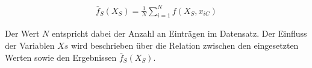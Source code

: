 \begin{equation}
  \begin{aligned}
    \bar{f}_S(X_S) = \frac{1}{N}\sum_{i=1}^{N}f(X_S, x_{iC})
  \end{aligned}
  \label{fig:partial_dependence}
\end{equation}

\noindent Der Wert $N$ entspricht dabei der Anzahl an Einträgen im Datensatz. Der Einfluss der Variablen $Xs$ wird beschrieben über die Relation zwischen den eingesetzten Werten sowie den Ergebnissen $\bar{f}_S(X_S)$.

